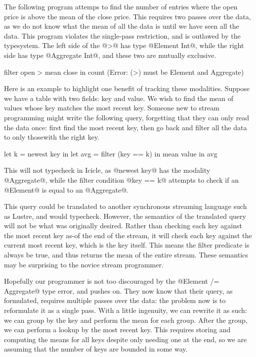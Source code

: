 The following program attemps to find the number of entries where the open price is above the mean of the close price.
This requires two passes over the data, as we do not know what the mean of all the data is until we have seen all the data.
This program violates the single-pass restriction, and is outlawed by the typesystem.
The left side of the @>@ has type @Element Int@, while the right side has type @Aggregate Int@, and these two are mutually exclusive.
\begin{code}
filter open > mean close
in count
(Error: (>) must be Element and Aggregate)
\end{code}



Here is an example to highlight one benefit of tracking these modalities.
Suppose we have a table with two fields: key and value.
We wish to find the mean of values whose key matches the most recent key.
Someone new to stream programming might write the following query, forgetting that they can only read the data once: first find the most recent key, then go back and filter all the data to only thosewith the right key.

\begin{code}
   let k    = newest key
in let avg  = filter (key == k) in mean value
in avg
\end{code}

This will not typecheck in Icicle, as @newest key@ has the modality @Aggregate@, while the filter condition @key == k@ attempts to check if an @Element@ is equal to an @Aggregate@.

This query could be translated to another synchronous streaming language such as {\sc Lustre}\cite{halbwachs1991synchronous}, and would typecheck.
However, the semantics of the translated query will not be what was originally desired.
Rather than checking each key against the most recent key as-of the end of the stream,
it will check each key against the current most recent key, which is the key itself.
This means the filter predicate is always be true, and thus returns the mean of the entire stream.
These semantics may be surprising to the novice stream programmer.

Hopefully our programmer is not too discouraged by the @Element /= Aggregate@ type error, and pushes on.
They now know that their query, as formulated, requires multiple passes over the data: the problem now is to reformulate it as a single pass.
With a little ingenuity, we can rewrite it as such: we can group by the key and perform the mean for each group.
After the group, we can perform a lookup by the most recent key.
This requires storing and computing the means for all keys despite only needing one at the end, so we are assuming that the number of keys are bounded in some way.

